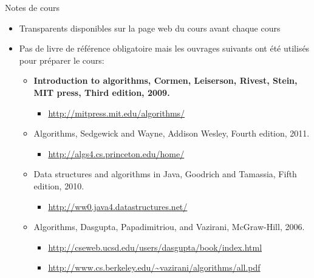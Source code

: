\begin{frame}{Notes de cours}
\begin{itemize}
\item Transparents disponibles sur la page web du cours avant chaque cours
\item Pas de livre de référence obligatoire mais les ouvrages suivants ont été utilisés pour préparer le cours:
{\small
\begin{itemize}
\item {\bf Introduction to algorithms, Cormen, Leiserson, Rivest, Stein, MIT press, Third edition, 2009.}
\begin{itemize}
\item \url{http://mitpress.mit.edu/algorithms/}
\end{itemize}
\item Algorithms, Sedgewick and Wayne, Addison Wesley, Fourth edition, 2011.
\begin{itemize}
\item \url{http://algs4.cs.princeton.edu/home/}
\end{itemize}
\item Data structures and algorithms in Java, Goodrich and Tamassia, Fifth edition, 2010.
\begin{itemize}
\item \url{http://ww0.java4.datastructures.net/}
\end{itemize}
\item Algorithms, Dasgupta, Papadimitriou, and Vazirani, McGraw-Hill, 2006.
\begin{itemize}
\item \url{http://cseweb.ucsd.edu/users/dasgupta/book/index.html}
\item \url{http://www.cs.berkeley.edu/~vazirani/algorithms/all.pdf}
\end{itemize}
\end{itemize}
}
\end{itemize}
\end{frame}


